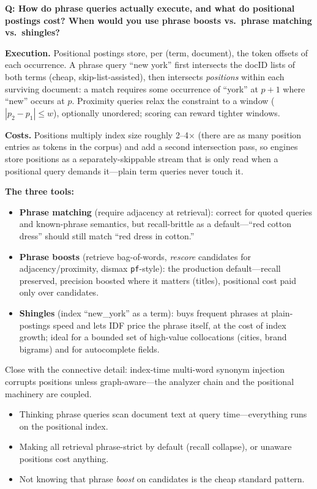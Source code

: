 \begin{interviewq}
\textbf{Q: How do phrase queries actually execute, and what do positional postings cost? When would you use phrase boosts vs.\ phrase matching vs.\ shingles?}

 \quad {} \quad \badgefreq{\freqlow}

\stronganswer

\textbf{Execution.} Positional postings store, per (term, document), the token offsets of each occurrence. A phrase query ``new york'' first intersects the docID lists of both terms (cheap, skip-list-assisted), then intersects \emph{positions} within each surviving document: a match requires some occurrence of ``york'' at $p+1$ where ``new'' occurs at $p$. Proximity queries relax the constraint to a window ($|p_2 - p_1| \le w$), optionally unordered; scoring can reward tighter windows.

\textbf{Costs.} Positions multiply index size roughly 2--4$\times$ (there are as many position entries as tokens in the corpus) and add a second intersection pass, so engines store positions as a separately-skippable stream that is only read when a positional query demands it---plain term queries never touch it.

\textbf{The three tools:}
\begin{itemize}
    \item \textbf{Phrase matching} (require adjacency at retrieval): correct for quoted queries and known-phrase semantics, but recall-brittle as a default---``red cotton dress'' should still match ``red dress in cotton.''
    \item \textbf{Phrase boosts} (retrieve bag-of-words, \emph{rescore} candidates for adjacency/proximity, dismax \texttt{pf}-style): the production default---recall preserved, precision boosted where it matters (titles), positional cost paid only over candidates.
    \item \textbf{Shingles} (index ``new\_york'' as a term): buys frequent phrases at plain-postings speed and lets IDF price the phrase itself, at the cost of index growth; ideal for a bounded set of high-value collocations (cities, brand bigrams) and for autocomplete fields.
\end{itemize}
Close with the connective detail: index-time multi-word synonym injection corrupts positions unless graph-aware---the analyzer chain and the positional machinery are coupled.

\redflags
\begin{itemize}
    \item Thinking phrase queries scan document text at query time---everything runs on the positional index.
    \item Making all retrieval phrase-strict by default (recall collapse), or unaware positions cost anything.
    \item Not knowing that phrase \emph{boost} on candidates is the cheap standard pattern.
\end{itemize}


\end{interviewq}
